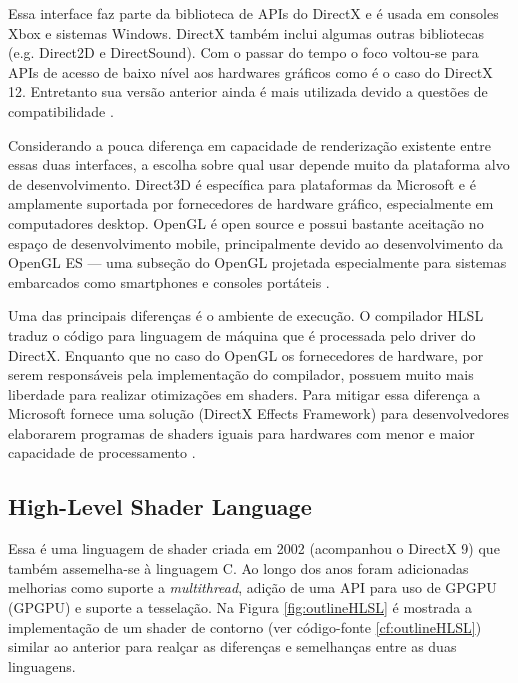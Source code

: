 Essa interface faz parte da biblioteca de APIs do DirectX e é usada em consoles Xbox e sistemas Windows. DirectX também inclui algumas outras bibliotecas (e.g. Direct2D e DirectSound). Com o passar do tempo o foco voltou-se para APIs de acesso de baixo nível aos hardwares gráficos como é o caso do DirectX 12. Entretanto sua versão anterior ainda é mais utilizada devido a questões de compatibilidade \cite{hasu2018modern}.

Considerando a pouca diferença em capacidade de renderização existente entre essas duas interfaces, a escolha sobre qual usar depende muito da plataforma alvo de desenvolvimento. Direct3D é específica para plataformas da Microsoft e é amplamente suportada por fornecedores de hardware gráfico, especialmente em computadores desktop. OpenGL é open source e possui bastante aceitação no espaço de desenvolvimento mobile, principalmente devido ao desenvolvimento da OpenGL ES --- uma subseção do OpenGL projetada especialmente para sistemas embarcados como smartphones e consoles portáteis \cite{HLSLBook}.

Uma das principais diferenças é o ambiente de execução. O compilador HLSL traduz o código para linguagem de máquina que é processada pelo driver do DirectX. Enquanto que no caso do OpenGL os fornecedores de hardware, por serem responsáveis pela implementação do compilador, possuem muito mais liberdade para realizar otimizações em shaders. Para mitigar essa diferença a Microsoft fornece uma solução (DirectX Effects Framework) para desenvolvedores elaborarem programas de shaders iguais para hardwares com menor e maior capacidade de processamento \cite{GLSLBook}.

\subsection{High-Level Shader Language}
\label{sec:hlsl}

Essa é uma linguagem de shader criada em 2002 (acompanhou o DirectX 9) que também assemelha-se à linguagem C. Ao longo dos anos foram adicionadas melhorias como suporte a \textit{\Gls{multithread}}, adição de uma API para uso de GPGPU (\acrlong{GPGPU}) e suporte a tesselação. Na Figura \ref{fig:outlineHLSL} é mostrada a implementação de um shader de contorno (ver código-fonte \ref{cf:outlineHLSL}) similar ao anterior para realçar as diferenças e semelhanças entre as duas linguagens.

\begin{figure}[h!]
	\centering
\end{figure}

